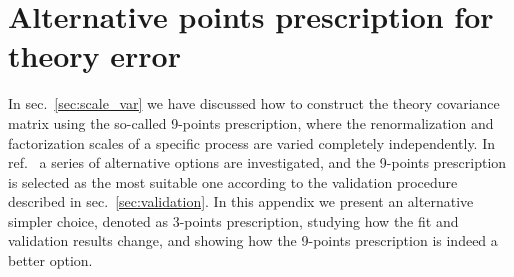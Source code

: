 \chapter{Alternative points prescription for theory error}
\label{app:the_error_3pt}
In sec.~\ref{sec:scale_var} we have discussed how to construct the theory covariance matrix using the so-called 9-points prescription, 
where the renormalization and factorization scales of a specific process are varied completely independently.
In ref.~\cite{AbdulKhalek:2019ihb} a series of alternative options are investigated, and the 9-points prescription is selected 
as the most suitable one according to the validation procedure described in sec.~\ref{sec:validation}.
In this appendix we present an alternative simpler choice, denoted as 3-points prescription,
studying how the fit and validation results change, and showing how the 9-points prescription is indeed a better option. 


